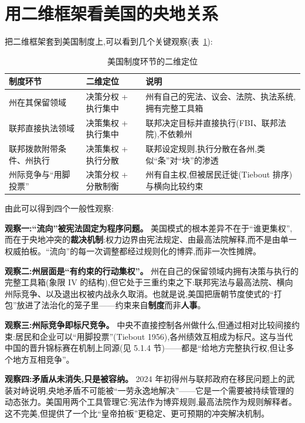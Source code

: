 \documentclass[UTF8,12pt,a4paper]{ctexrep}
\begin{document}
\section{用二维框架看美国的央地关系}

把二维框架套到美国制度上,可以看到几个关键观察(表~\ref{tab:us-matrix}):

\begin{table}[htbp]
  \centering
  \small
  \caption{美国制度环节的二维定位}
  \label{tab:us-matrix}
  \begin{tabularx}{\linewidth}{@{}lXX@{}}
    \toprule
    \textbf{制度环节} & \textbf{二维定位} & \textbf{说明} \\
    \midrule
    州在其保留领域 & 决策分权 + 执行集中 & 州有自己的宪法、议会、法院、执法系统,拥有完整工具箱 \\
    联邦直接执法领域 & 决策集权 + 执行集中 & 联邦决定目标并直接执行(FBI、联邦法院),不依赖州 \\
    联邦拨款附带条件、州执行 & 决策集权 + 执行分散 & 联邦设定规则,执行分散在各州,类似``条''对``块''的渗透 \\
    州际竞争与``用脚投票'' & 决策分权 + 分散制衡 & 州有自主权,但被居民迁徙(Tiebout 排序)与横向比较约束 \\
    \bottomrule
  \end{tabularx}
\end{table}

由此可以得到四个一般性观察:

\textbf{观察一:``流向''被宪法固定为程序问题。} 美国模式的根本差异不在于``谁更集权'',而在于央地冲突的\textbf{裁决机制}:权力边界由宪法规定、由最高法院解释,而不是由单一权威拍板。``流向''的每一次调整都经过规则化的博弈,而非一次性摊牌。

\textbf{观察二:州层面是``有约束的行动集权''。} 州在自己的保留领域内拥有决策与执行的完整工具箱(象限 IV 的结构),但它处于三重约束之下:联邦宪法与最高法院、横向州际竞争、以及退出权被内战永久取消。也就是说,美国把唐朝节度使式的``打包''放进了法治化的笼子里——约束来自\textbf{制度}而非\textbf{人事}。

\textbf{观察三:州际竞争即标尺竞争。} 中央不直接控制各州做什么,但通过相对比较间接约束:居民和企业可以``用脚投票''(Tiebout 1956),各州绩效互相成为标尺。这与当代中国的晋升锦标赛在机制上同源(见 5.1.4 节)——都是``给地方完整执行权,但让多个地方互相竞争''。

\textbf{观察四:矛盾从未消失,只是被容纳。} 2024 年初得州与联邦政府在移民问题上的武装对峙说明,央地矛盾不可能被``一劳永逸地解决''——它是一个需要被持续管理的动态张力。美国用两个工具管理它:宪法作为博弈规则,最高法院作为规则解释者。这不完美,但提供了一个比``皇帝拍板''更稳定、更可预期的冲突解决机制。
\end{document}
